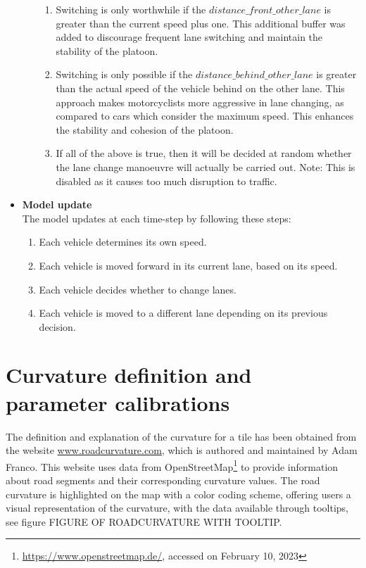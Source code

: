 \begin{itemize}
\begin{itemize}
\begin{enumerate}
         \item Switching is only worthwhile if the $distance\_front\_other\_lane$ is greater than the current speed plus one. This additional buffer was added to discourage frequent lane switching and maintain the stability of the platoon.
         \item Switching is only possible if the $distance\_behind\_other\_lane$ is greater than the actual speed of the vehicle behind on the other lane. This approach makes motorcyclists more aggressive in lane changing, as compared to cars which consider the maximum speed. This enhances the stability and cohesion of the platoon.
         \item If all of the above is true, then it will be decided at random whether the lane change manoeuvre will actually be carried out. Note: This is disabled as it causes too much disruption to traffic.
         \end{enumerate}  
     \end{itemize}

     \item \textbf{Model update}\\
     The model updates at each time-step by following these steps:
     \begin{enumerate}
         \item Each vehicle determines its own speed.
         \item Each vehicle is moved forward in its current lane, based on its speed.
         \item Each vehicle decides whether to change lanes.
         \item Each vehicle is moved to a different lane depending on its previous decision.
     \end{enumerate}
 \end{itemize}

 \section{Curvature definition and parameter calibrations}
 \label{sec:Curvature definition and parameter calibration}
The definition and explanation of the curvature for a tile has been obtained from the website \hyperlink{}{www.roadcurvature.com}, which is authored and maintained by Adam Franco\cite{roadcurvature.com}.
This website uses data from OpenStreetMap\textsuperscript{\textcopyright}\footnote{\hyperlink{}{https://www.openstreetmap.de/}, accessed on February 10, 2023} to provide information about road segments and their corresponding curvature values. The road curvature is highlighted on the map with a color coding scheme, offering users a visual representation of the curvature, with the data available through tooltips, see figure FIGURE OF ROADCURVATURE WITH TOOLTIP.

